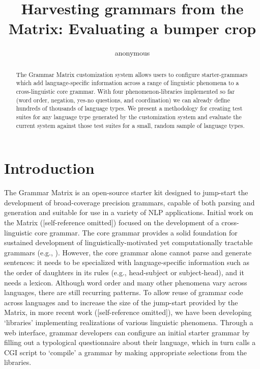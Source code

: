 \documentclass[11pt]{article}
\title{Harvesting grammars from the Matrix: Evaluating a bumper crop}
\author{anonymous}
\date{}
\begin{document}
\maketitle
\begin{abstract}
The Grammar Matrix customization system allows users to configure
starter-grammars which add language-specific information across a
range of linguistic phenomena to a cross-linguistic core grammar.
With four phenomenon-libraries implemented so far (word order,
negation, yes-no questions, and coordination) we can already define
hundreds of thousands of language types.  We present a methodology for
creating test suites for any language type generated by the
customization system and evaluate the current system against those
test suites for a small, random sample of language types.
\end{abstract}

\section{Introduction}

The Grammar Matrix is an open-source starter kit designed to jump-start
the development of broad-coverage precision grammars, capable of both
parsing and generation and suitable for use in a variety of NLP applications.
Initial work on the Matrix ([self-reference omitted])
focused on the development of a cross-linguistic core grammar.  The
core grammar provides a solid foundation for sustained development of
linguistically-motivated yet computationally tractable grammars (e.g.,
\cite{Hel:Hau:03,Kor:Neu:05}).  However, the core grammar alone cannot
parse and generate sentences: it needs to be specialized with
language-specific information such as the order of daughters in its rules
(e.g., head-subject or subject-head), and it needs a lexicon.
Although word order and many other phenomena vary across languages,
there are still recurring patterns.  To allow reuse of grammar code
across languages and to increase the size of the jump-start provided
by the Matrix, in more recent work ([self-reference omitted]),
we have been developing `libraries' implementing realizations
of various linguistic phenomena.  Through a web interface, grammar
developers can configure an initial starter grammar by filling out
a typological questionnaire about their language, which in turn
calls a CGI script to `compile' a grammar by making appropriate selections
from the libraries.
\end{document}
